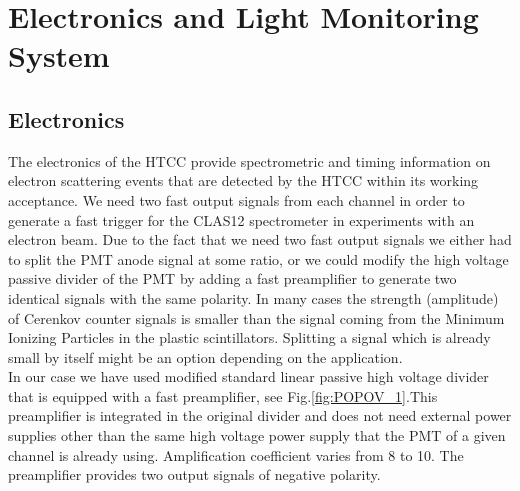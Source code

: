 \section{Electronics and Light Monitoring System}
\subsection{Electronics}

\indent The electronics of the HTCC provide spectrometric and timing information on electron scattering events that are detected by the HTCC within its working acceptance. We need two fast output signals from each channel in order to generate a fast trigger for the CLAS12 spectrometer in experiments with an electron beam. Due to the fact that we need two fast output signals we either had to split the PMT anode signal at some ratio, or we could modify the high voltage passive divider of the PMT by adding a fast preamplifier to generate two identical signals with the same polarity. In many cases the strength (amplitude) of Cerenkov counter signals is smaller than the signal coming from the Minimum Ionizing Particles in the plastic scintillators. Splitting a signal which is already small by itself might be an option depending on the application. \\
\indent In our case we have used modified standard linear passive high voltage divider that is equipped with a fast preamplifier, see Fig.\ref{fig:POPOV_1}.This preamplifier is integrated in the original divider and does not need external power supplies other than the same high voltage power supply that the PMT of a given channel is already using. Amplification coefficient varies from 8 to 10. The preamplifier provides two output signals of negative polarity. 

